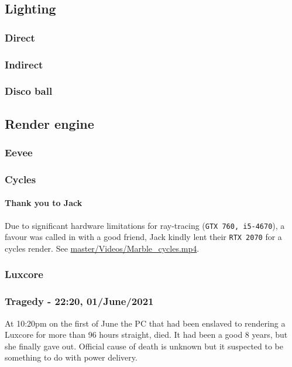 \documentclass[11pt]{article}
\begin{document}
\subsection{Lighting}
\label{sec:org6468a44}
\subsubsection{Direct}
\label{sec:orgbba6fbd}
\subsubsection{Indirect}
\label{sec:org190985b}
\subsubsection{Disco ball}
\label{sec:org3e00aea}
\subsection{Render engine}
\label{sec:orgf5baf58}
\subsubsection{Eevee}
\label{sec:org57300c3}
\subsubsection{Cycles}
\label{sec:orgbe5d7ea}
\paragraph{Thank you to Jack}
\label{sec:orga6da89f}
Due to significant hardware limitations for ray-tracing (\texttt{GTX 760, i5-4670}), a
favour was called in with a good friend, Jack kindly lent their \texttt{RTX 2070}  for a
cycles render. See \href{https://github.com/Jake-Moss/blender-chess/blob/master/Videos/Marble\_cycles.mp4}{master/Videos/Marble\_cycles.mp4}.
\subsubsection{Luxcore}
\label{sec:org2bf891a}
\subsubsection{Tragedy - 22:20, 01/June/2021}
\label{sec:org18a09d9}
At 10:20pm on the first of June the PC that had been enslaved to rendering a
Luxcore for more than 96 hours straight, died. It had been a good 8 years, but
she finally gave out. Official cause of death is unknown but it suspected to be
something to do with power delivery.
\end{document}
